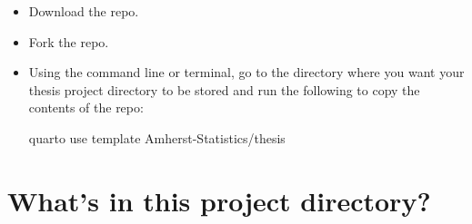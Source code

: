 \documentclass[
  11pt,
  letterpaper,
  twoside]{report}
\newenvironment{Shaded}{}{}
\newcommand{\NormalTok}[1]{\textcolor[rgb]{0.22,0.23,0.26}{#1}}
\begin{document}
\begin{itemize}
\item
  Download the repo.
\item
  Fork the repo.
\item
  Using the command line or terminal, go to the directory where you want
  your thesis project directory to be stored and run the following to
  copy the contents of the repo:

\begin{Shaded}
\begin{Highlighting}[numbers=left,,]
\NormalTok{quarto use template Amherst{-}Statistics/thesis}
\end{Highlighting}
\end{Shaded}
\end{itemize}

\section{What's in this project
directory?}\label{whats-in-this-project-directory}
\end{document}
